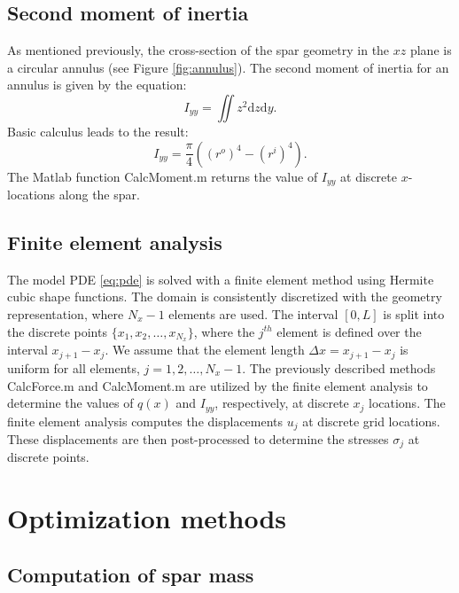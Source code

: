 \documentclass[11pt]{article}
\begin{document}
\subsection{Second moment of inertia}

As mentioned previously, the cross-section of the spar
geometry in the $xz$ plane is a circular annulus
(see Figure \ref{fig:annulus}). The second moment
of inertia for an annulus is given by the equation:
\begin{equation}
I_{yy} = \iint z^2 \text{d} z \text{d} y.
\end{equation}
Basic calculus leads to the result:
\begin{equation}
I_{yy} = \frac{\pi}{4} \left ( (r^o)^4 - (r^i)^4 \right).
\end{equation}
The Matlab function CalcMoment.m returns the value
of $I_{yy}$ at discrete $x$-locations along the spar.

\subsection{Finite element analysis}

The model PDE \eqref{eq:pde} is solved with a finite
element method using Hermite cubic shape functions.
The domain is consistently discretized with the geometry
representation, where $N_x-1$ elements are used. The interval
$[0,L]$ is split into the discrete points
$\{ x_1, x_2, \dots, x_{N_x} \}$, where the $j^{th}$
element is defined over the interval $x_{j+1} - x_j$.
We assume that the element length $\Delta x = x_{j+1} - x_j$
is uniform for all elements, $j=1,2,\dots,N_x-1$.
The previously described methods CalcForce.m and
CalcMoment.m are utilized by the finite element analysis
to determine the values of $q(x)$ and $I_{yy}$, respectively,
at discrete $x_j$ locations. The finite element analysis
computes the displacements $u_j$ at discrete grid locations.
These displacements are then post-processed to determine
the stresses $\sigma_j$ at discrete points.

\section{Optimization methods}

\subsection{Computation of spar mass}
\end{document}
